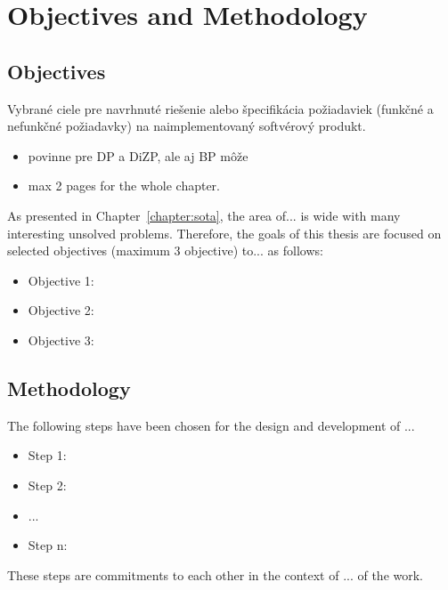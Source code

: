 \chapter{Objectives and Methodology}
\label{chapter:objectives-and-methodology}

\section{Objectives}
\label{sec:objectives}

Vybrané ciele pre navrhnuté riešenie alebo špecifikácia požiadaviek (funkčné a nefunkčné požiadavky) na naimplementovaný softvérový produkt.

\begin{itemize}
    \item povinne pre DP a DiZP, ale aj BP môže
    \item max 2 pages for the whole chapter.
\end{itemize}

As presented in Chapter~\ref{chapter:sota}, the area of... is wide with many interesting unsolved problems. Therefore, the goals of this thesis are focused on selected objectives (maximum 3 objective) to... as follows:

\begin{itemize}
    \item Objective 1:
    \item Objective 2:
    \item Objective 3:
\end{itemize}



\section{Methodology}
\label{sec:methodology}

The following steps have been chosen for the design and development of ...

\begin{itemize}
    \item Step 1:
    \item Step 2:
    \item ...
    \item Step n:
\end{itemize}

These steps are commitments to each other in the context of ... of the work.